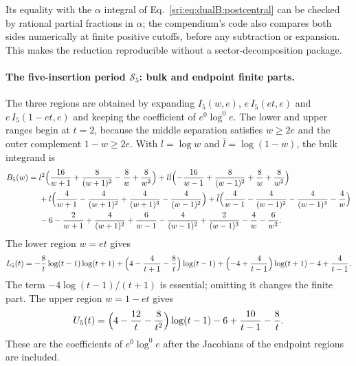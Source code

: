Its equality with the $\alpha$ integral of Eq.~\eqref{sri:eq:dualB:postcentral} can be checked by rational partial
fractions in $\alpha$; the compendium's code also compares both sides numerically at finite positive cutoffs, before
any subtraction or expansion. This makes the reduction reproducible without a sector-decomposition package.

\paragraph{The five-insertion period $\mathcal S_5$: bulk and endpoint finite parts.} The three regions are obtained by
expanding $I_5(w,e)$, $e\,I_5(et,e)$ and $e\,I_5(1-et,e)$ and keeping the coefficient of $e^0\log^0e$. The lower and
upper ranges begin at $t=2$, because the middle separation satisfies $w\ge2e$ and the outer complement $1-w\ge2e$.
With $l=\log w$ and $\bar l=\log(1-w)$, the bulk integrand is
\begin{equation}
\begin{aligned}
 B_5(w)={}&l^2\Bigl(\frac{16}{w+1}+\frac8{(w+1)^2}-\frac8w+\frac8{w^2}\Bigr)
 +l\bar l\Bigl(-\frac{16}{w-1}+\frac8{(w-1)^2}+\frac8w+\frac8{w^2}\Bigr)\\
 &+l\Bigl(\frac4{w+1}-\frac4{(w+1)^2}+\frac4{(w+1)^3}-\frac4{(w-1)^2}\Bigr)
 +\bar l\Bigl(\frac4{w-1}-\frac4{(w-1)^2}-\frac4{(w-1)^3}-\frac4w\Bigr)\\
 &-6-\frac2{w+1}+\frac4{(w+1)^2}+\frac6{w-1}-\frac4{(w-1)^2}+\frac2{(w-1)^3}-\frac4w-\frac6{w^2}.
\end{aligned}
\label{sri:eq:dualB:B5}
\end{equation}
The lower region $w=et$ gives
\begin{equation}
 L_5(t)=-\frac8t\log(t-1)\log(t+1)+\Bigl(4-\frac4{t+1}-\frac8t\Bigr)\log(t-1)
 +\Bigl(-4+\frac4{t-1}\Bigr)\log(t+1)-4+\frac4{t-1}.
 \label{sri:eq:dualB:L5}
\end{equation}
The term $-4\log(t-1)/(t+1)$ is essential; omitting it changes the finite part. The upper region $w=1-et$ gives
\begin{equation}
 U_5(t)=\Bigl(4-\frac{12}{t}-\frac8{t^2}\Bigr)\log(t-1)-6+\frac{10}{t-1}-\frac8t.
 \label{sri:eq:dualB:U5}
\end{equation}
These are the coefficients of $e^0\log^0e$ after the Jacobians of the endpoint regions are included.

